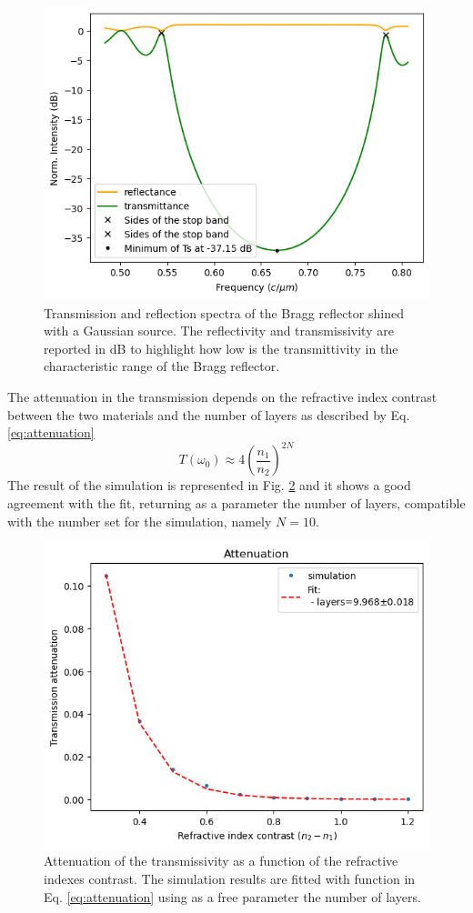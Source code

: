 \begin{figure}[H]
    \centering
    \includegraphics[width=0.6\linewidth]{Figures/bragg_spectrum.png}
    \caption{Transmission and reflection spectra of the Bragg reflector shined with a Gaussian source. The reflectivity and transmissivity are reported in dB to highlight how low is the transmittivity in the characteristic range of the Bragg reflector.}
    \label{fig:bragg_spectrum}
\end{figure}

The attenuation in the transmission depends on the refractive index contrast between the two materials and the number of layers as described by Eq. \ref{eq:attenuation}
\begin{equation} \label{eq:attenuation}
    T(\omega_0) \approx 4 \left(\frac{n_1}{n_2}\right)^{2N} 
\end{equation}
The result of the simulation is represented in Fig. \ref{fig:bragg_attenuation_vs_index} and it shows a good agreement with the fit, returning as a parameter the number of layers, compatible with the number set for the simulation, namely \(N=10\).

\begin{figure}[H]
    \centering
    \includegraphics[width=0.6\linewidth]{Figures/bragg_attenuation_vs_index.png}
    \caption{Attenuation of the transmissivity as a function of the refractive indexes contrast. The simulation results are fitted with function in Eq. \ref{eq:attenuation} using as a free parameter the number of layers.}
    \label{fig:bragg_attenuation_vs_index}
\end{figure}


